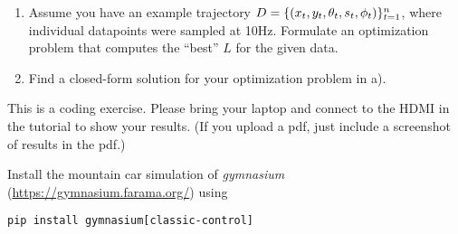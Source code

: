 





\begin{enumerate}
\item Assume you have an example trajectory $D=\{(x_t,y_t,\theta_t,s_t,\phi_t)\}_{t=1}^n$, where individual datapoints were sampled at 10Hz. Formulate an optimization problem that computes the ``best'' $L$ for the given data.


\item Find a closed-form solution for your optimization problem in a).



\end{enumerate}



This is a coding exercise. Please bring your laptop and connect to the HDMI in the tutorial to show your results. (If you upload a pdf, just include a screenshot of results in the pdf.)

Install the mountain car simulation of \emph{gymnasium} (\url{https://gymnasium.farama.org/}) using
\begin{code}
\begin{Verbatim}[numbers=none,fontsize=\footnotesize]
pip install gymnasium[classic-control]
\end{Verbatim}
\end{code}


